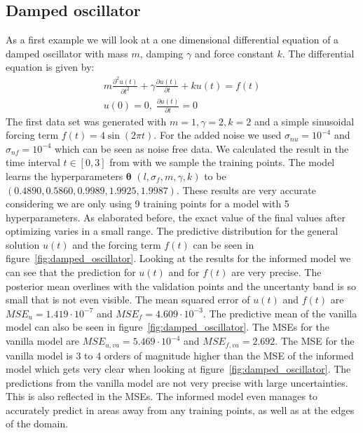 \documentclass{article}
\begin{document}
\subsection{Damped oscillator}
As a first example we will look at a one dimensional differential equation of a
damped oscillator with mass $m$, damping $\gamma$ and force constant $k$. The
differential equation is given by:
\begin{equation}
    \begin{aligned}
        m\frac{\partial^2 u(t)}{\partial t^2} + \gamma \frac{\partial u(t)}{\partial t} + k u(t) = f(t) \\ u(0) = 0, \; \frac{\partial u(t)}{\partial t} = 0
    \end{aligned}
\end{equation}
The first data set was generated with $m = 1, \gamma = 2, k = 2$ and a simple sinusoidal forcing term $f(t) = 4 \sin(2\pi t)$. For the added noise we used $\sigma_{nu} = 10^{-4}$ and $\sigma_{nf} = 10^{-4}$ which can be seen as noise free data. We calculated the result in the time interval $t \in [0,3]$ from with we sample the training points. The model learns the hyperparameters $\bm{\theta}$ $(l,\sigma_f,m,\gamma,k)$ to be $(0.4890, 0.5860, 0.9989, 1.9925, 1.9987)$. These results are very accurate considering we are only using 9 training points for a model with 5 hyperparameters. As elaborated before, the exact value of the final values after optimizing varies in a small range. The predictive distribution for the general solution $u(t)$ and the forcing term $f(t)$ can be seen in figure~\ref{fig:damped_oscillator}. Looking at the results for the informed model we can see that the prediction for $u(t)$ and for $f(t)$ are very precise. The posterior mean overlines with the validation points and the uncertanty band is so small that is not even visible. The mean squared error of $u(t)$ and $f(t)$ are $MSE_u = 1.419 \cdot 10^{-7}$ and $MSE_f = 4.609 \cdot 10^{-3}$. The predictive mean of the vanilla model can also be seen in figure~\ref{fig:damped_oscillator}. The MSEs for the vanilla model are $MSE_{u,va} = 5.469 \cdot 10^{-4}$ and $MSE_{f,va} = 2.692$. The MSE for the vanilla model is 3 to 4 orders of magnitude higher than the MSE of the informed model which gets very clear when looking at figure~\ref{fig:damped_oscillator}. The predictions from the vanilla model are not very precise with large uncertainties. This is also reflected in the MSEs. The informed model even manages to accurately predict in areas away from any training points, as well as at the edges of the domain.
\end{document}

